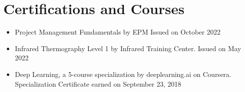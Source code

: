 \documentclass{my_cv}%
\begin{document}
\section{Certifications and Courses}
\vspace{1em}
\begin{itemize}[leftmargin=0.15in]
\setlength\itemsep{-0.1em}
\color{mygray}
\item[\faCertificate] Project Management Fundamentals by EPM Issued on October 2022
\item[\faCertificate] Infrared Thermography Level 1 by Infrared Training Center. Issued on May 2022
\item[\faCertificate] Deep Learning, a 5-course specialization by deeplearning.ai on Coursera. Specialization Certificate earned on September 23, 2018
\end{itemize}

\end{document}
